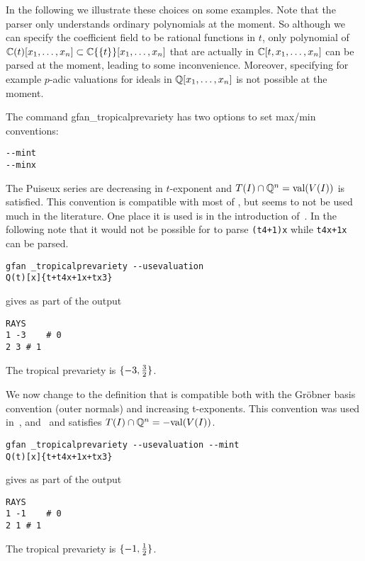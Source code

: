 In the following we illustrate these choices on some examples. Note that the \name parser only understands ordinary polynomials at the moment. So although we can specify the coefficient field to be rational functions in $t$, only polynomial of $\mathbb{C}(t)[x_1,\dots,x_n]\subset{\ensuremath{\mathbb{C}\{\{t\}\}} }[x_1,\dots,x_n]$ that are actually in $\mathbb{C}[t,x_1,\dots,x_n]$ can be parsed at the moment, leading to some inconvenience. Moreover, specifying for example $p$-adic valuations for ideals in $\mathbb{Q}[x_1,\dots,x_n]$ is not possible at the moment.

The command {gfan\_tropicalprevariety} has two options to set max/min conventions:
\begin{verbatim}
--mint
--minx
\end{verbatim}

\begin{example}
The Puiseux series are decreasing in $t$-exponent and $T(I)\cap\mathbb{Q}^n=\textup{val}(V(I))$ is satisfied. This convention is compatible with most of \name, but seems to not be used much in the literature. One place it is used is in the introduction of~\cite{ctv}. In the following note that it would not be possible for \name to parse \texttt{(t4+1)x} while \texttt{t4x+1x} can be parsed.

\begin{verbatim}
gfan _tropicalprevariety --usevaluation
Q(t)[x]{t+t4x+1x+tx3}
\end{verbatim}
gives as part of the output
\begin{verbatim}
RAYS
1 -3	# 0
2 3	# 1
\end{verbatim}
The tropical prevariety is $\{-3,{3\over 2}\}$.
\end{example}


\begin{example}
We now change to the definition that is compatible both with the Gr\"obner basis convention (outer normals) and increasing t-exponents. This convention was used in~\cite{sturmfelssolving}, \cite{lifting} and~\cite{thesis} and satisfies $T(I)\cap\mathbb{Q}^n=-\textup{val}(V(I))$.
\begin{verbatim}
gfan _tropicalprevariety --usevaluation --mint
Q(t)[x]{t+t4x+1x+tx3}
\end{verbatim}
gives as part of the output
\begin{verbatim}
RAYS
1 -1	# 0
2 1	# 1
\end{verbatim}
The tropical prevariety is $\{-1,{1\over 2}\}$.
\end{example}

